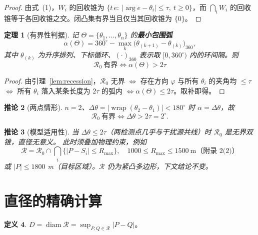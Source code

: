 \documentclass[11pt,a4paper]{ctexart}
\newtheorem{theorem}{定理}
\newtheorem{corollary}[theorem]{推论}
\theoremstyle{definition}
\newtheorem{definition}[theorem]{定义}
\theoremstyle{remark}
\newcommand{\argvec}{\arg}
\newcommand{\diam}{\operatorname{diam}}
\newcommand{\wrap}{\operatorname{wrap}}
\begin{document}
\begin{proof}
由式~(1)，$W_i$ 的回收锥为 $\{t\,e:\ |\argvec e-\theta_i|\le\tau,\ t\ge0\}$，而
$\bigcap_iW_i$ 的回收锥等于各回收锥之交。闭凸集有界当且仅当其回收锥为 $\{0\}$。
\end{proof}

\begin{theorem}[有界性判据]\label{thm:bounded}
记 $\Theta=\{\theta_1,\dots,\theta_n\}$ 的\textbf{最小包围弧}
\begin{equation}
\alpha(\Theta)=360^\circ-\max_{k}\bigl(\theta_{(k+1)}-\theta_{(k)}\bigr)_{360},
\end{equation}
其中 $\theta_{(k)}$ 为升序排列、下标循环、$(\cdot)_{360}$ 表示取 $[0,360^\circ)$ 内的环间隔。则
\begin{equation}
\boxed{\ \mathcal R_0\ \text{有界}\iff\alpha(\Theta)>2\tau\ }
\end{equation}
\end{theorem}

\begin{proof}
由引理~\ref{lem:recession}，$\mathcal R_0$ 无界 $\iff$ 存在方向 $\varphi$ 与所有 $\theta_i$ 的夹角均 $\le\tau$
$\iff$ 所有 $\theta_i$ 落入某条长度为 $2\tau$ 的弧内 $\iff\alpha(\Theta)\le2\tau$。取补即得。
\end{proof}

\begin{corollary}[两点情形]
$n=2$、$\Delta\theta=\lvert\wrap(\theta_2-\theta_1)\rvert<180^\circ$ 时 $\alpha=\Delta\theta$，故
\[
\mathcal R_0\ \text{有界}\iff\Delta\theta>2\tau=2^\circ .
\]
\end{corollary}

\begin{corollary}[模型适用性]\label{cor:boundedness}
当 $\Delta\theta\le2\tau$（两检测点几乎与干扰源共线）时 $\mathcal R_0$ 是无界双锥，直径无意义。
此时须叠加物理约束，例如
\[
\mathcal R=\mathcal R_0\cap\bigcap_{i}\{|P-S_i|\le R_{\max}\},
\quad 1000\le R_{\max}\le1500\ \text{m（附录~2(2)）}
\]
或 $|P|\le1800$ m（目标区域）。$\mathcal R$ 仍为紧凸多边形，下文结论不变。
\end{corollary}

\section{直径的精确计算}

\begin{definition}
$D=\diam\mathcal R=\sup_{P,Q\in\mathcal R}|P-Q|$。
\end{definition}
\end{document}
